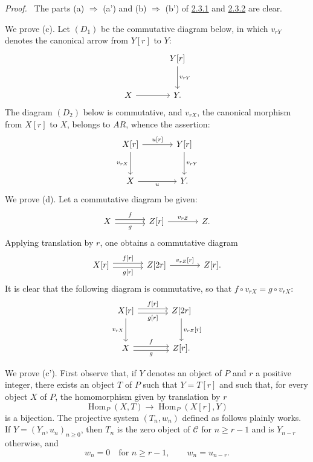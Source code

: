 \documentclass[11pt]{article}
\newenvironment{prooftext}[1][Proof]{\par\noindent\emph{#1.}\ }{\par\medskip}
\DeclareMathOperator{\Hom}{Hom}
\providecommand{\Hom}{\operatorname{Hom}}
\providecommand{\cC}{\mathcal C}
\providecommand{\cC}{\mathcal C}
\providecommand{\Hom}{\operatorname{Hom}}
\begin{document}
\begin{prooftext}[Proof]
The parts (a) $\Rightarrow$ (a') and (b) $\Rightarrow$ (b') of \hyperref[sga5:V:definition:2.3.1]{2.3.1} and \hyperref[sga5:V:definition:2.3.2]{2.3.2} are clear.

We prove (c). Let $(D_1)$ be the commutative diagram below, in which $v_{rY}$ denotes the canonical arrow from $Y[r]$ to $Y$:
\[
\begin{tikzcd}[column sep=large,row sep=large]
& Y[r] \arrow[d,"{v_{rY}}"]\\
X \arrow[r] & Y .
\end{tikzcd}
\]
The diagram $(D_2)$ below is commutative, and $v_{rX}$, the canonical morphism from $X[r]$ to $X$, belongs to $AR$, whence the assertion:
\[
\begin{tikzcd}[column sep=large,row sep=large]
X[r] \arrow[r,"{u[r]}"] \arrow[d,"{v_{rX}}"'] & Y[r] \arrow[d,"{v_{rY}}"]\\
X \arrow[r,"u"'] & Y .
\end{tikzcd}
\]
We prove (d). Let a commutative diagram be given:
\[
\begin{tikzcd}[column sep=large]
X \arrow[r,shift left,"f"] \arrow[r,shift right,"g"'] & Z[r] \arrow[r,"{v_{rZ}}"] & Z .
\end{tikzcd}
\]
Applying translation by $r$, one obtains a commutative diagram
\[
\begin{tikzcd}[column sep=large]
X[r] \arrow[r,shift left,"{f[r]}"] \arrow[r,shift right,"{g[r]}"'] & Z[2r] \arrow[r,"{v_{rZ}[r]}"] & Z[r].
\end{tikzcd}
\]
It is clear that the following diagram is commutative, so that $f\circ v_{rX}=g\circ v_{rX}$:
\[
\begin{tikzcd}[column sep=large,row sep=large]
X[r] \arrow[r,shift left,"{f[r]}"] \arrow[r,shift right,"{g[r]}"'] \arrow[d,"{v_{rX}}"'] & Z[2r] \arrow[d,"{v_{rZ}[r]}"]\\
X \arrow[r,shift left,"f"] \arrow[r,shift right,"g"'] & Z[r] .
\end{tikzcd}
\]

We prove (c'). First observe that, if $Y$ denotes an object of $P$ and $r$ a positive integer, there exists an object $T$ of $P$ such that $Y=T[r]$ and such that, for every object $X$ of $P$, the homomorphism given by translation by $r$
\[
\Hom_P(X,T)\longrightarrow\Hom_P(X[r],Y)
\]
is a bijection. The projective system $(T_n,w_n)$ defined as follows plainly works. If $Y=(Y_n,u_n)_{n\ge0}$, then $T_n$ is the zero object of $\cC$ for $n\ge r-1$ and is $Y_{n-r}$ otherwise, and
\[
w_n=0\quad\text{for }n\ge r-1,\qquad w_n=u_{n-r}.
\]


\end{prooftext}
\end{document}
